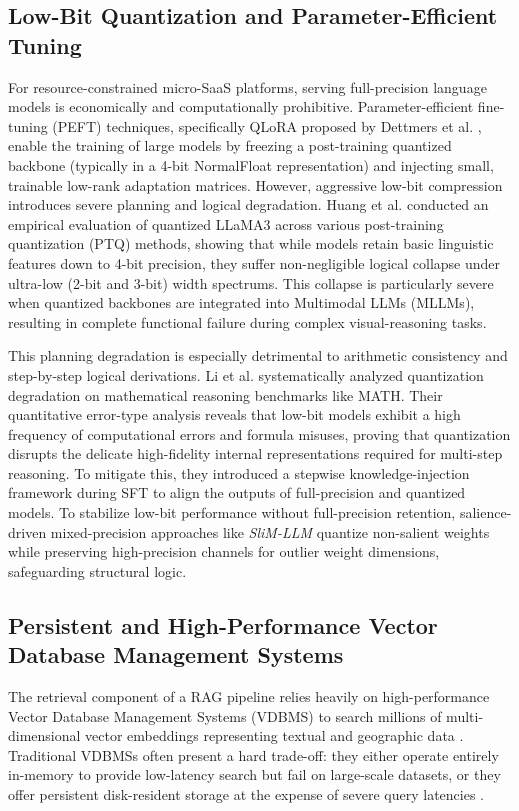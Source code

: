 \documentclass{ieeeaccess}
\begin{document}
\subsection{Low-Bit Quantization and Parameter-Efficient Tuning}
For resource-constrained micro-SaaS platforms, serving full-precision language models is economically and computationally prohibitive. Parameter-efficient fine-tuning (PEFT) techniques, specifically QLoRA proposed by Dettmers et al. \cite{dettmers-qlora-2024}, enable the training of large models by freezing a post-training quantized backbone (typically in a 4-bit NormalFloat representation) and injecting small, trainable low-rank adaptation matrices. However, aggressive low-bit compression introduces severe planning and logical degradation. Huang et al. \cite{huang-llama3-quant-2024} conducted an empirical evaluation of quantized LLaMA3 across various post-training quantization (PTQ) methods, showing that while models retain basic linguistic features down to 4-bit precision, they suffer non-negligible logical collapse under ultra-low (2-bit and 3-bit) width spectrums. This collapse is particularly severe when quantized backbones are integrated into Multimodal LLMs (MLLMs), resulting in complete functional failure during complex visual-reasoning tasks.

This planning degradation is especially detrimental to arithmetic consistency and step-by-step logical derivations. Li et al. \cite{li-quant-meets-reasoning-2025} systematically analyzed quantization degradation on mathematical reasoning benchmarks like MATH. Their quantitative error-type analysis reveals that low-bit models exhibit a high frequency of computational errors and formula misuses, proving that quantization disrupts the delicate high-fidelity internal representations required for multi-step reasoning. To mitigate this, they introduced a stepwise knowledge-injection framework during SFT to align the outputs of full-precision and quantized models. To stabilize low-bit performance without full-precision retention, salience-driven mixed-precision approaches like \emph{SliM-LLM} \cite{slim-llm-2024} quantize non-salient weights while preserving high-precision channels for outlier weight dimensions, safeguarding structural logic.

\subsection{Persistent and High-Performance Vector Database Management Systems}
The retrieval component of a RAG pipeline relies heavily on high-performance Vector Database Management Systems (VDBMS) to search millions of multi-dimensional vector embeddings representing textual and geographic data \cite{pan-vector-survey-2024, jing-vdb-survey-2024}. Traditional VDBMSs often present a hard trade-off: they either operate entirely in-memory to provide low-latency search but fail on large-scale datasets, or they offer persistent disk-resident storage at the expense of severe query latencies \cite{sun-gaussdb-vector-2025}. 
\end{document}
